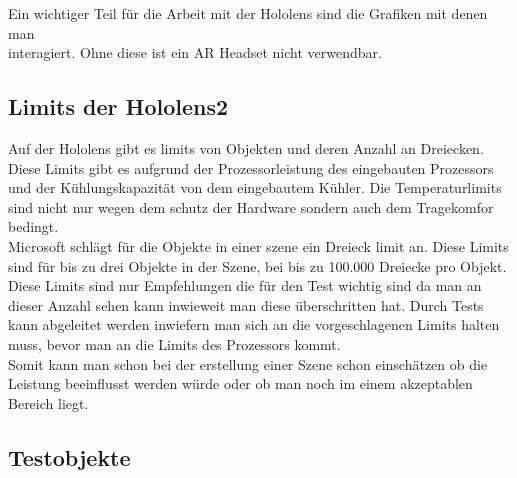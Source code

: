 Ein wichtiger Teil für die Arbeit mit der Hololens sind die Grafiken mit denen man \\ interagiert. Ohne diese ist ein AR Headset nicht verwendbar.\\
\subsection{Limits der Hololens2}\label{subsec:Limits der Hololens2}

Auf der Hololens gibt es limits von Objekten und deren Anzahl an Dreiecken.
Diese Limits gibt es aufgrund der Prozessorleistung des eingebauten Prozessors und der Kühlungskapazität von dem eingebautem Kühler.
Die Temperaturlimits sind nicht nur wegen dem schutz der Hardware sondern auch dem Tragekomfor bedingt.\\
Microsoft schlägt für die Objekte in einer szene ein Dreieck limit an. Diese Limits sind für bis zu drei Objekte in der Szene, bei bis zu 100.000\autocite{optimize_3d} Dreiecke pro Objekt.\\ 
Diese Limits sind nur Empfehlungen die für den Test wichtig sind da man an dieser Anzahl sehen kann inwieweit man diese überschritten hat.
Durch Tests kann abgeleitet werden inwiefern man sich an die vorgeschlagenen Limits halten muss, bevor man an die Limits des Prozessors kommt.\\
Somit kann man schon bei der erstellung einer Szene schon einschätzen ob die Leistung beeinflusst werden würde oder ob man noch im einem akzeptablen Bereich liegt.



\newpage
\subsection{Testobjekte}\label{subsec:Testobjekte}



